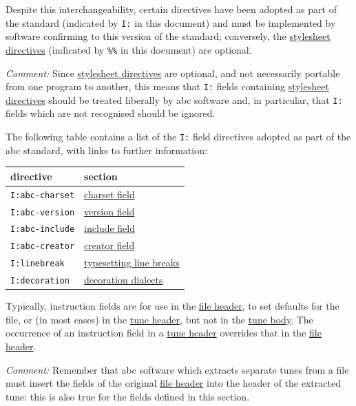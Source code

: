 \documentclass[oneside]{book}
\begin{document}
Despite this interchangeability, certain directives have been adopted as
part of the standard (indicated by \texttt{I:} in this document) and
must be implemented by software confirming to this version of the
standard; conversely, the
\protect\hyperlink{stylesheet_directive_definition}{stylesheet
directives} (indicated by \texttt{\%\%} in this document) are optional.

\emph{Comment:} Since
\protect\hyperlink{stylesheet_directive_definition}{stylesheet
directives} are optional, and not necessarily portable from one program
to another, this means that \texttt{I:} fields containing
\protect\hyperlink{stylesheet_directive_definition}{stylesheet
directives} should be treated liberally by abc software and, in
particular, that \texttt{I:} fields which are not recognised should be
ignored.

The following table contains a list of the \texttt{I:} field directives
adopted as part of the abc standard, with links to further information:

\begin{longtable}[]{@{}ll@{}}
\toprule
directive & section\tabularnewline
\midrule
\endhead
\texttt{I:abc-charset} & \protect\hyperlink{charset_field}{charset
field}\tabularnewline
\texttt{I:abc-version} & \protect\hyperlink{version_field}{version
field}\tabularnewline
\texttt{I:abc-include} & \protect\hyperlink{include_field}{include
field}\tabularnewline
\texttt{I:abc-creator} & \protect\hyperlink{creator_field}{creator
field}\tabularnewline
\texttt{I:linebreak} &
\protect\hyperlink{typesetting_line-breaks}{typesetting line
breaks}\tabularnewline
\texttt{I:decoration} &
\protect\hyperlink{decoration_dialects}{decoration
dialects}\tabularnewline
\bottomrule
\end{longtable}

Typically, instruction fields are for use in the
\protect\hyperlink{file_header_definition}{file header}, to set defaults
for the file, or (in most cases) in the
\protect\hyperlink{tune_header_definition}{tune header}, but not in the
\protect\hyperlink{tune_body_definition}{tune body}. The occurrence of
an instruction field in a
\protect\hyperlink{tune_header_definition}{tune header} overrides that
in the \protect\hyperlink{file_header_definition}{file header}.

\emph{Comment:} Remember that abc software which extracts separate tunes
from a file must insert the fields of the original
\protect\hyperlink{file_header_definition}{file header} into the header
of the extracted tune: this is also true for the fields defined in this
section.
\end{document}
